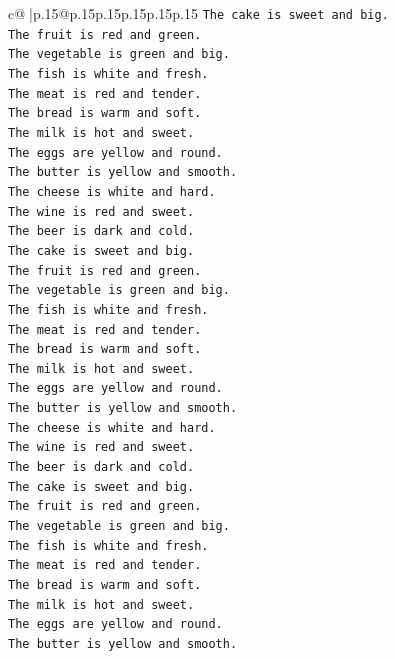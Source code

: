 \documentclass{article}
\begin{document}
{\begin{supertabular}{c@{$\;$}|p{.15\linewidth}@{}p{.15\linewidth}p{.15\linewidth}p{.15\linewidth}p{.15\linewidth}p{.15\linewidth}}
{{{\texttt{The cake is sweet and big.} \\
\texttt{The fruit is red and green.} \\
\texttt{The vegetable is green and big.} \\
\texttt{The fish is white and fresh.} \\
\texttt{The meat is red and tender.} \\
\texttt{The bread is warm and soft.} \\
\texttt{The milk is hot and sweet.} \\
\texttt{The eggs are yellow and round.} \\
\texttt{The butter is yellow and smooth.} \\
\texttt{The cheese is white and hard.} \\
\texttt{The wine is red and sweet.} \\
\texttt{The beer is dark and cold.} \\
\texttt{The cake is sweet and big.} \\
\texttt{The fruit is red and green.} \\
\texttt{The vegetable is green and big.} \\
\texttt{The fish is white and fresh.} \\
\texttt{The meat is red and tender.} \\
\texttt{The bread is warm and soft.} \\
\texttt{The milk is hot and sweet.} \\
\texttt{The eggs are yellow and round.} \\
\texttt{The butter is yellow and smooth.} \\
\texttt{The cheese is white and hard.} \\
\texttt{The wine is red and sweet.} \\
\texttt{The beer is dark and cold.} \\
\texttt{The cake is sweet and big.} \\
\texttt{The fruit is red and green.} \\
\texttt{The vegetable is green and big.} \\
\texttt{The fish is white and fresh.} \\
\texttt{The meat is red and tender.} \\
\texttt{The bread is warm and soft.} \\
\texttt{The milk is hot and sweet.} \\
\texttt{The eggs are yellow and round.} \\
\texttt{The butter is yellow and smooth.} \\
}}}
\end{supertabular}}
\end{document}
